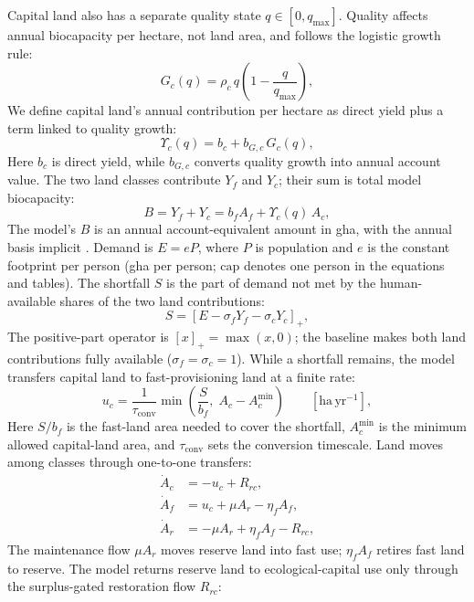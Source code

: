\documentclass[preprint,12pt,authoryear]{elsarticle}
\newcommand{\pos}[1]{\left[#1\right]_+}
\newcommand{\Ups}{\Upsilon_c}
\newcommand{\Acmin}{A_c^{\min}}
\newcommand{\tconv}{\tau_{\mathrm{conv}}}
\begin{document}
Capital land also has a separate quality state $q\in[0,q_{\max}]$. Quality affects annual biocapacity per hectare, not land area, and follows the logistic growth rule:
\begin{equation}\label{eq:Gc}
G_c(q)=\rho_c\,q\left(1-\frac{q}{q_{\max}}\right),
\end{equation}
We define capital land's annual contribution per hectare as direct yield plus a term linked to quality growth:
\begin{equation}\label{eq:Ups}
\Ups(q)=b_c+b_{G,c}\,G_c(q),
\end{equation}
Here $b_c$ is direct yield, while $b_{G,c}$ converts quality growth into annual account value. The two land classes contribute $Y_f$ and $Y_c$; their sum is total model biocapacity:
\begin{equation}\label{eq:B}
B=Y_f+Y_c=b_f A_f+\Ups(q)\,A_c ,
\end{equation}
The model's $B$ is an annual account-equivalent amount in gha, with the annual basis implicit \citep{GFNStandards2009,GFNGuidebook2019}. Demand is $E=eP$, where $P$ is population and $e$ is the constant footprint per person (gha per person; $\mathrm{cap}$ denotes one person in the equations and tables). The shortfall $S$ is the part of demand not met by the human-available shares of the two land contributions:
\begin{equation}\label{eq:S}
S=\pos{E-\sigma_f Y_f-\sigma_c Y_c},
\end{equation}
The positive-part operator is $\pos{x}=\max(x,0)$; the baseline makes both land contributions fully available ($\sigma_f=\sigma_c=1$). While a shortfall remains, the model transfers capital land to fast-provisioning land at a finite rate:
\begin{equation}\label{eq:uc}u_c=\frac{1}{\tconv}\min\!\left(\frac{S}{b_f},\;A_c-\Acmin\right)\qquad[\mathrm{ha\,yr^{-1}}],
\end{equation}
Here $S/b_f$ is the fast-land area needed to cover the shortfall, $\Acmin$ is the minimum allowed capital-land area, and $\tconv$ sets the conversion timescale. Land moves among classes through one-to-one transfers:
\begin{align}
\dot A_c&=-u_c+R_{rc},\label{eq:Ac}\\
\dot A_f&=u_c+\mu A_r-\eta_f A_f,\label{eq:Af}\\
\dot A_r&=-\mu A_r+\eta_f A_f-R_{rc},\label{eq:Ar}
\end{align}
The maintenance flow $\mu A_r$ moves reserve land into fast use; $\eta_f A_f$ retires fast land to reserve. The model returns reserve land to ecological-capital use only through the surplus-gated restoration flow $R_{rc}$:
\end{document}
